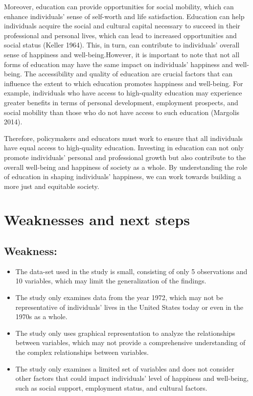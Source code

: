 \documentclass[
  letterpaper,
  DIV=11,
  numbers=noendperiod]{scrartcl}
\providecommand{\tightlist}{%
  \setlength{\itemsep}{0pt}\setlength{\parskip}{0pt}}\usepackage{longtable,booktabs,array}
\begin{document}
Moreover, education can provide opportunities for social mobility, which
can enhance individuals' sense of self-worth and life satisfaction.
Education can help individuals acquire the social and cultural capital
necessary to succeed in their professional and personal lives, which can
lead to increased opportunities and social status (Keller 1964). This,
in turn, can contribute to individuals' overall sense of happiness and
well-being.However, it is important to note that not all forms of
education may have the same impact on individuals' happiness and
well-being. The accessibility and quality of education are crucial
factors that can influence the extent to which education promotes
happiness and well-being. For example, individuals who have access to
high-quality education may experience greater benefits in terms of
personal development, employment prospects, and social mobility than
those who do not have access to such education (Margolis 2014).

Therefore, policymakers and educators must work to ensure that all
individuals have equal access to high-quality education. Investing in
education can not only promote individuals' personal and professional
growth but also contribute to the overall well-being and happiness of
society as a whole. By understanding the role of education in shaping
individuals' happiness, we can work towards building a more just and
equitable society.

\hypertarget{weaknesses-and-next-steps}{%
\section{Weaknesses and next steps}\label{weaknesses-and-next-steps}}

\hypertarget{weakness}{%
\subsection{Weakness:}\label{weakness}}

\begin{itemize}
\tightlist
\item
  The data-set used in the study is small, consisting of only 5
  observations and 10 variables, which may limit the generalization of
  the findings.
\item
  The study only examines data from the year 1972, which may not be
  representative of individuals' lives in the United States today or
  even in the 1970s as a whole.
\item
  The study only uses graphical representation to analyze the
  relationships between variables, which may not provide a comprehensive
  understanding of the complex relationships between variables.
\item
  The study only examines a limited set of variables and does not
  consider other factors that could impact individuals' level of
  happiness and well-being, such as social support, employment status,
  and cultural factors.
\end{itemize}
\end{document}
